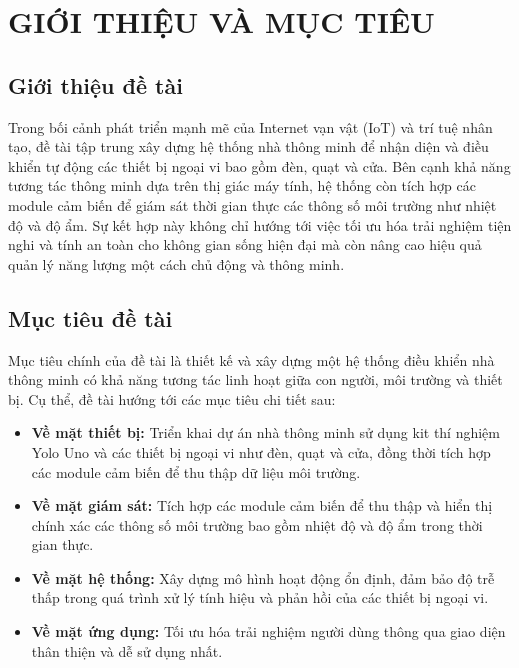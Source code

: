 \section{GIỚI THIỆU VÀ MỤC TIÊU}
\subsection{Giới thiệu đề tài}

Trong bối cảnh phát triển mạnh mẽ của Internet vạn vật (IoT) và trí tuệ nhân tạo, đề tài tập trung xây dựng hệ thống nhà thông minh để nhận diện và điều khiển tự động các thiết bị ngoại vi bao gồm đèn, quạt và cửa. Bên cạnh khả năng tương tác thông minh dựa trên thị giác máy tính, hệ thống còn tích hợp các module cảm biến để giám sát thời gian thực các thông số môi trường như nhiệt độ và độ ẩm. Sự kết hợp này không chỉ hướng tới việc tối ưu hóa trải nghiệm tiện nghi và tính an toàn cho không gian sống hiện đại mà còn nâng cao hiệu quả quản lý năng lượng một cách chủ động và thông minh.

\subsection{Mục tiêu đề tài}

Mục tiêu chính của đề tài là thiết kế và xây dựng một hệ thống điều khiển nhà thông minh có khả năng tương tác linh hoạt giữa con người, môi trường và thiết bị. Cụ thể, đề tài hướng tới các mục tiêu chi tiết sau:

\begin{itemize}
    \item \textbf{Về mặt thiết bị:} Triển khai dự án nhà thông minh sử dụng kit thí nghiệm Yolo Uno và các thiết bị ngoại vi như đèn, quạt và cửa, đồng thời tích hợp các module cảm biến để thu thập dữ liệu môi trường.
    \item \textbf{Về mặt giám sát:} Tích hợp các module cảm biến để thu thập và hiển thị chính xác các thông số môi trường bao gồm nhiệt độ và độ ẩm trong thời gian thực.
    \item \textbf{Về mặt hệ thống:} Xây dựng mô hình hoạt động ổn định, đảm bảo độ trễ thấp trong quá trình xử lý tính hiệu và phản hồi của các thiết bị ngoại vi.
    \item \textbf{Về mặt ứng dụng:} Tối ưu hóa trải nghiệm người dùng thông qua giao diện thân thiện và dễ sử dụng nhất.
\end{itemize}

\newpage